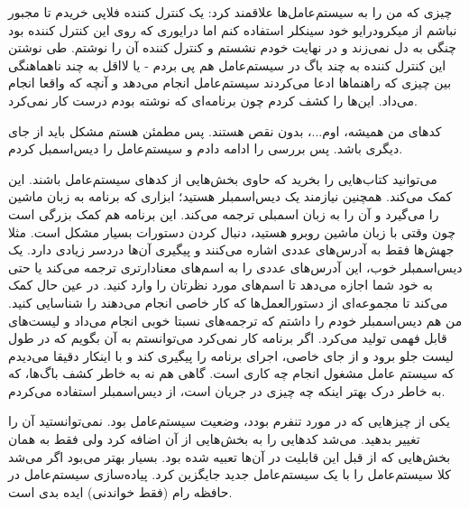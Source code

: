 چیزی که من را به سیستم‌عامل‌ها علاقمند کرد: یک کنترل کننده فلاپی خریدم
تا مجبور نباشم از میکرودرایو خود سینکلر استفاده کنم اما درایوری که روی
این کنترل کننده بود چنگی به دل نمی‌زند و در نهایت خودم نشستم و کنترل
کننده آن را نوشتم. طی نوشتن این کنترل کننده به چند باگ در
سیستم‌عامل هم پی بردم - یا لااقل به چند ناهماهنگی بین چیزی که راهنماها
ادعا می‌کردند سیستم‌عامل انجام می‌دهد و آنچه که واقعا انجام می‌داد. این‌ها
را کشف کردم چون برنامه‌ای که نوشته بودم درست کار نمی‌کرد.

کدهای من همیشه، اوم...، بدون نقص هستند. پس مطمئن هستم مشکل باید از جای
دیگری باشد. پس بررسی را ادامه دادم و سیستم‌عامل را
دیس‌اسمبل کردم.

می‌توانید کتاب‌هایی را بخرید که حاوی بخش‌هایی از کدهای سیستم‌عامل
باشند. این کمک می‌کند. همچنین نیازمند یک دیس‌اسمبلر هستید؛‌ ابزاری که
برنامه به زبان ماشین را می‌گیرد و آن را به زبان اسمبلی ترجمه می‌کند. این
برنامه هم کمک بزرگی است چون وقتی با زبان ماشین روبرو هستید، دنبال کردن
دستورات بسیار مشکل است. مثلا جهش‌ها فقط به آدرس‌های عددی اشاره می‌کنند و
پیگیری‌ آن‌ها دردسر زیادی دارد. یک دیس‌اسمبلر خوب، این آدرس‌های عددی را به
اسم‌های معنادارتری ترجمه می‌کند یا حتی به خود شما اجازه می‌دهد تا اسم‌های
مورد نظرتان را وارد کنید. در عین حال کمک می‌کند تا مجموعه‌ای از
دستورالعمل‌ها که کار خاصی انجام می‌دهند را شناسایی کنید. من هم دیس‌اسمبلر
خودم را داشتم که ترجمه‌های نسبتا خوبی انجام می‌داد و لیست‌های قابل فهمی
تولید می‌کرد. اگر برنامه کار نمی‌کرد می‌توانستم به آن بگویم که در طول
لیست جلو برود و از جای خاصی، اجرای برنامه را پیگیری کند و با اینکار
دقیقا می‌دیدم که سیستم عامل مشغول انجام چه کاری است. گاهی هم نه به خاطر
کشف باگ‌ها، که به خاطر درک بهتر اینکه چه چیزی در جریان است، از
دیس‌اسمبلر استفاده می‌کردم.

یکی از چیزهایی که در مورد تنفرم بودد، وضعیت 
سیستم‌عامل بود. نمی‌توانستید آن را تغییر بدهید. می‌شد کدهایی را به
بخش‌هایی از آن اضافه کرد ولی فقط به همان بخش‌هایی که از قبل این قابلیت
در آن‌ها تعبیه شده بود. بسیار بهتر می‌بود اگر می‌شد کلا سیستم‌عامل را با
یک سیستم‌عامل جدید جایگزین کرد. پیاده‌سازی سیستم‌عامل در حافظه
رام (فقط خواندنی) ایده بدی است.


